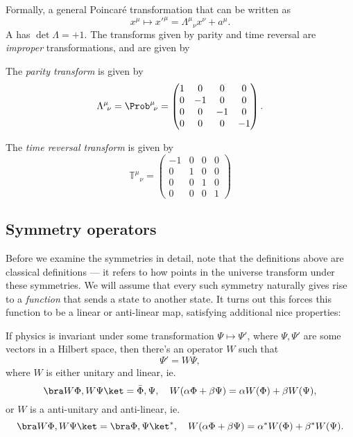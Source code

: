 \documentclass[a4paper]{article}
\begin{document}
Formally, a general Poincar\'e transformation that can be written as
\[
  x^\mu \mapsto x'^\mu = \Lambda^\mu\!_\nu x^\nu + a^\mu.
\]
A  has $\det \Lambda = +1$. The transforms given by parity and time reversal are \emph{improper} transformations, and are given by
\begin{defi}
  The \emph{parity transform} is given by
  \[
    \Lambda^\mu\!_\nu = \Prob^\mu\!_\nu =
    \begin{pmatrix}
      1 & 0 & 0 & 0\\
      0 & -1 & 0 & 0\\
      0 & 0 & -1 & 0\\
      0 & 0 & 0 & -1
    \end{pmatrix}.
  \]
\end{defi}

\begin{defi}
  The \emph{time reversal transform} is given by
  \[
    \mathbb{T}^\mu\!_\nu =
    \begin{pmatrix}
      -1 & 0 & 0 & 0\\
      0 & 1 & 0 & 0\\
      0 & 0 & 1 & 0\\
      0 & 0 & 0 & 1
    \end{pmatrix}
  \]
\end{defi}

\subsection{Symmetry operators}
Before we examine the symmetries in detail, note that the definitions above are classical definitions --- it refers to how points in the universe transform under these symmetries. We will assume that every such symmetry naturally gives rise to a \emph{function} that sends a state to another state. It turns out this forces this function to be a linear or anti-linear map, satisfying additional nice properties:

\begin{thm}[Wigner]
  If physics is invariant under some transformation $\Psi \mapsto \Psi'$, where $\Psi, \Psi'$ are some vectors in a Hilbert space, then there's an operator $W$ such that
  \[
    \Psi' = W \Psi,
  \]
  where $W$ is either unitary and linear, ie.
  \[
    \bra W \Phi, W \Psi\ket = \bar \Phi, \Psi,\quad W(\alpha \Phi + \beta \Psi) = \alpha W(\Phi) + \beta W(\Psi),
  \]
  or $W$ is a anti-unitary and anti-linear, ie.
  \[
    \bra W \Phi, W \Psi\ket = \bra \Phi, \Psi\ket^*,\quad W(\alpha \Phi + \beta \Psi) = \alpha^* W(\Phi) + \beta^* W(\Psi).
  \]
\end{thm}
\end{document}
